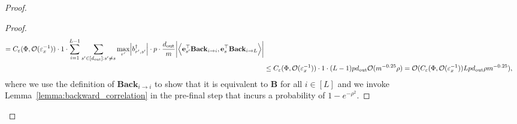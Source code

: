 \begin{claim}
\begin{proof}
\begin{proof}
\begin{align*}
						= C_\varepsilon(\Phi, \mathcal{O}( \varepsilon_x^{-1})) \cdot 1 \cdot \sum_{i=1}^{L-1} \sum_{s' \in [d_{\mathrm{out}} ]: s' \ne s} \max_{r'}   \abs{b_{r', s'}^{\dagger}} \cdot p \cdot  \frac{d_{\mathrm{out}} }{m} \abs{\left\langle \mathbf{e}_{s'}^{\top} \mathbf{Back}_{i \to i},  \mathbf{e}_{s}^{\top} \mathbf{Back}_{i \to L} \right\rangle} \\&
						\le C_\varepsilon(\Phi, \mathcal{O}( \varepsilon_x^{-1})) \cdot 1 \cdot (L-1) p d_{\mathrm{out}}  \mathcal{O}(m^{-0.25} \rho) = \mathcal{O}(C_\varepsilon(\Phi, \mathcal{O}( \varepsilon_x^{-1})) L p d_{\mathrm{out}} \rho m^{-0.25}),
					\end{align*}
					\endgroup
					where we use the definition of $\mathbf{Back}_{i \to i}$ to show that it is equivalent to $\mathbf{B}$ for all $i \in [L]$ and we invoke Lemma~\ref{lemma:backward_correlation} in the pre-final step that incurs a probability of $1 - e^{-\rho^2}$.
					

\end{proof}
\end{proof}
\end{claim}
